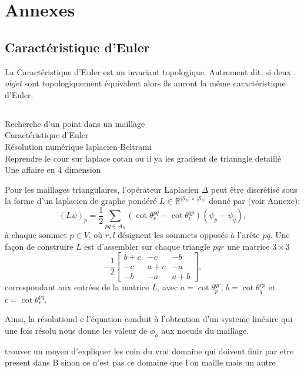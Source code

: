 \chapter*{Annexes}
\label{chap:annexes}

\section{Caractéristique d'Euler}

La Caractéristique d'Euler est un invariant topologique. Autrement dit, si deux \emph{objet} sont topologiquement équivalent alors ils auront la même caractéristique d'Euler.

\section{}

Recherche d'un point dans un maillage\\
Caractéristique d'Euler\\
Résolution numérique laplacien-Beltrami\\
Reprendre le cour sur laplace cotan ou il ya les gradient de trianngle detaillé\\
Une affaire en 4 dimension
\[\]

Pour les maillages triangulaires, l'opérateur Laplacien $\Delta$ peut être discrétisé sous la forme d'un laplacien de graphe pondéré $L\in\mathbb{R}^{|\mathcal{S}_h|\times|\mathcal{S}_h|}$ donné par \cite{sharp2019vector} (voir Annexe):
$$
(L\psi)_p=\frac{1}{2}\sum_{pq\in\mathcal{A}_h}(\cot\theta_r^{pq}-\cot\theta_l^{qp})(\psi_p-\psi_q),
$$
à chaque sommet $p\in V$, où $r, l$ désignent les sommets opposés à l'arête $pq$. Une façon de construire $L$ est d'assembler sur chaque triangle $pqr$ une matrice $3\times 3$
$$
-\frac{1}{2}
\begin{bmatrix}
b+c & -c & -b\\
-c & a+c & -a\\
-b & -a & a+b
\end{bmatrix},
$$
correspondant aux entrées de la matrice $L$, avec $a=\cot\theta_p^{qr}$, $b=\cot\theta_q^{rp}$ et $c=\cot\theta_r^{pq}$.

Ainsi, la résolutiond e l'équation conduit à l'obtention d'un systeme linéaire qui une fois résolu nous donne les valeur de $\phi_h$ aux noeuds du maillage.

\[\]
trouver un moyen d'expliquer les coin du vrai domaine qui doivent finir par etre present dans B sinon ce n'est pas ce domaine que l'on maille mais un autre
